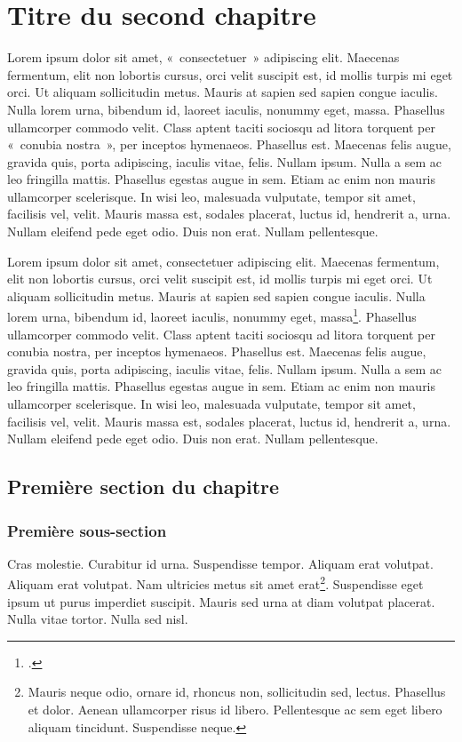 \clearemptydoublepage
\chapter{Titre du second chapitre}

Lorem ipsum dolor sit amet, «~consectetuer~» adipiscing elit. Maecenas fermentum, elit non lobortis cursus, orci velit suscipit est, id mollis turpis mi eget orci. Ut aliquam sollicitudin metus. Mauris at sapien sed sapien congue iaculis. Nulla lorem urna, bibendum id, laoreet iaculis, nonummy eget, massa. Phasellus ullamcorper commodo velit. Class aptent taciti sociosqu ad litora torquent per «~conubia nostra~», per inceptos hymenaeos. Phasellus est. Maecenas felis augue, gravida quis, porta adipiscing, iaculis vitae, felis. Nullam ipsum. Nulla a sem ac leo fringilla mattis. Phasellus egestas augue in sem. Etiam ac enim non mauris ullamcorper scelerisque. In wisi leo, malesuada vulputate, tempor sit amet, facilisis vel, velit. Mauris massa est, sodales placerat, luctus id, hendrerit a, urna. Nullam eleifend pede eget odio. Duis non erat. Nullam pellentesque.

Lorem ipsum dolor sit amet, consectetuer adipiscing elit. Maecenas fermentum, elit non lobortis cursus, orci velit suscipit est, id mollis turpis mi eget orci. Ut aliquam sollicitudin metus. Mauris at sapien sed sapien congue iaculis. Nulla lorem urna, bibendum id, laoreet iaculis, nonummy eget, massa\footcite[12]{Pierre1901}. Phasellus ullamcorper commodo velit. Class aptent taciti sociosqu ad litora torquent per conubia nostra, per inceptos hymenaeos. Phasellus est. Maecenas felis augue, gravida quis, porta adipiscing, iaculis vitae, felis. Nullam ipsum. Nulla a sem ac leo fringilla mattis. Phasellus egestas augue in sem. Etiam ac enim non mauris ullamcorper scelerisque. In wisi leo, malesuada vulputate, tempor sit amet, facilisis vel, velit. Mauris massa est, sodales placerat, luctus id, hendrerit a, urna. Nullam eleifend pede eget odio. Duis non erat. Nullam pellentesque. 

\section{Première section du chapitre}

\subsection{Première sous-section}

Cras molestie. Curabitur id urna. Suspendisse tempor. Aliquam erat volutpat. Aliquam erat volutpat. Nam ultricies metus sit amet erat\footnote{Mauris neque odio, ornare id, rhoncus non, sollicitudin sed, lectus. Phasellus et dolor. Aenean ullamcorper risus id libero. Pellentesque ac sem eget libero aliquam tincidunt. Suspendisse neque.}. Suspendisse eget ipsum ut purus imperdiet suscipit. Mauris sed urna at diam volutpat placerat. Nulla vitae tortor. Nulla sed nisl.

